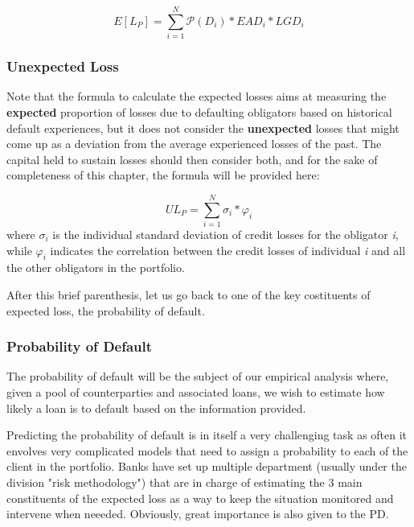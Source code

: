 \documentclass[a4paper,12pt]{article}
\begin{document}
        \begin{equation}
            E[L_{P}]=\sum_{i=1}^{N} \mathcal{P}(D_{i})*EAD_{i}*LGD_{i}
        \end{equation}

    \subsubsection{Unexpected Loss}
    Note that the formula to calculate the expected losses aims at measuring the \textbf{expected} proportion of losses due to defaulting obligators based on historical default experiences, but 
    it does not consider the \textbf{unexpected} losses that might come up as a deviation from the average experienced losses of the past. The capital held to sustain
    losses should then consider both, and for the sake of completeness of this chapter, the formula will be provided here:

        \begin{equation}
            UL_{P}=\sum_{i=1}^{N} \sigma_{i}*\varphi_{i}
        \end{equation}
        where $\sigma_{i}$ is the individual standard deviation of credit losses for the obligator \textit{i}, while $\varphi_{i}$ indicates the correlation between 
        the credit losses of individual \textit{i} and all the other obligators in the portfolio.

    After this brief parenthesis, let us go back to one of the key costituents of 
    expected loss, the probability of default.

    \subsubsection{Probability of Default}

    The probability of default will be the subject of our empirical analysis where, 
    given a pool of counterparties and associated loans, we wish to estimate how
    likely a loan is to default based on the information provided.

    Predicting the probability of default is in itself a very challenging task as 
    often it envolves very complicated models that need to assign a probability
    to each of the client in the portfolio. Banks have set up multiple department 
    (usually under the division "risk methodology") that are in charge of 
    estimating the 3 main constituents of the expected loss as a way to keep the situation
    monitored and intervene when neeeded. Obviously, great importance is also given to the PD.
\end{document}
